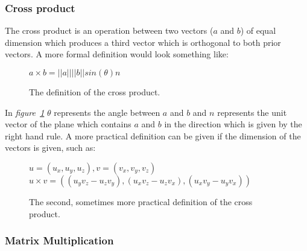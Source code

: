 \subsubsection{Cross product}

The cross product is an operation between two vectors ($a$ and $b$) of equal dimension which produces a third vector which is orthogonal to both prior vectors. A more formal definition would look something like:

\begin{figure}[H]
	\begin{center}
		$a \times b = \left\vert\left\vert a \right\vert\right\vert \left\vert\left\vert b \right\vert\right\vert sin(\theta) n$
		\caption{The definition of the cross product.}
		\label{cross-formula}
	\end{center}
\end{figure}

In \textit{figure~\ref{cross-formula}} $\theta$ represents the angle between $a$ and $b$ and $n$ represents the unit vector of the plane which contains $a$ and $b$ in the direction which is given by the right hand rule. A more practical definition can be given if the dimension of the vectors is given, such as:\cite{cross-howto}

\begin{figure}[H]
	\begin{center}
		$ u = (u_x, u_y, u_z), v = (v_x, v_y, v_z)$
		$ u \times v = ((u_y v_z - u_z v_y), (u_x v_z - u_z v_x), (u_x v_y - u_y v_x))$
		\caption{The second, sometimes more practical definition of the cross product.}
		\label{cross-formula-2}
	\end{center}
\end{figure}

\subsubsection{Matrix Multiplication}

